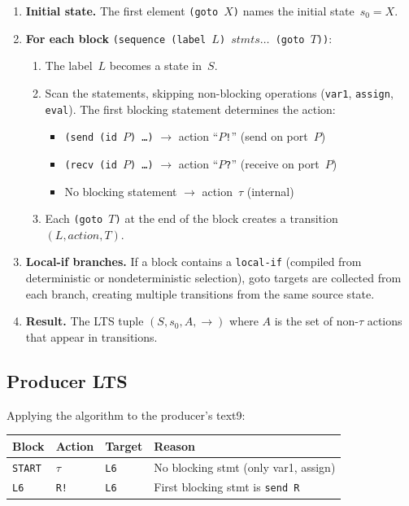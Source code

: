 \documentclass[11pt]{article}
\begin{document}
\begin{enumerate}
\item \textbf{Initial state.}  The first element \texttt{(goto~$X$)}
  names the initial state~$s_0 = X$.

\item \textbf{For each block} \texttt{(sequence (label~$L$)
  $\mathit{stmts}\ldots$ (goto~$T$))}:
  \begin{enumerate}
  \item The label~$L$ becomes a state in~$S$.
  \item Scan the statements, skipping non-blocking operations
    (\texttt{var1}, \texttt{assign}, \texttt{eval}).  The first
    blocking statement determines the action:
    \begin{itemize}
    \item \texttt{(send (id~$P$) \ldots)} $\to$ action
      ``$P$\texttt{!}'' (send on port~$P$)
    \item \texttt{(recv (id~$P$) \ldots)} $\to$ action
      ``$P$\texttt{?}'' (receive on port~$P$)
    \item No blocking statement $\to$ action~$\tau$ (internal)
    \end{itemize}
  \item Each \texttt{(goto~$T$)} at the end of the block creates a
    transition $(L, \mathit{action}, T)$.
  \end{enumerate}

\item \textbf{Local-if branches.}  If a block contains a
  \texttt{local-if} (compiled from deterministic or nondeterministic
  selection), goto targets are collected from each branch,
  creating multiple transitions from the same source state.

\item \textbf{Result.}  The LTS tuple $(S, s_0, A, {\to})$ where
  $A$ is the set of non-$\tau$ actions that appear in transitions.
\end{enumerate}

\subsection{Producer LTS}

Applying the algorithm to the producer's text9:

\begin{center}
\begin{tabular}{llll}
\toprule
\textbf{Block} & \textbf{Action} & \textbf{Target} & \textbf{Reason} \\
\midrule
\texttt{START} & $\tau$           & \texttt{L6}     & No blocking stmt (only var1, assign) \\
\texttt{L6}    & \texttt{R!}      & \texttt{L6}     & First blocking stmt is \texttt{send R} \\
\bottomrule
\end{tabular}
\end{center}
\end{document}

